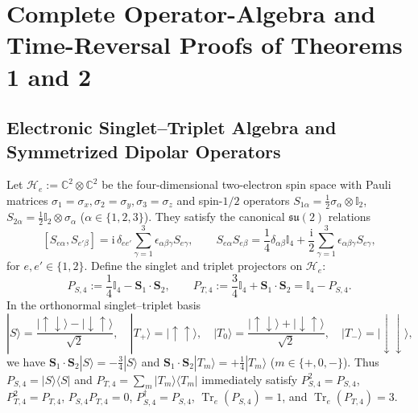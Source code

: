 \documentclass[onecolumn,10pt,notitlepage,amsmath,amssymb,floatfix]{revtex4-2}
\theoremstyle{plain}
\theoremstyle{definition}
\newcommand{\ii}{\mathrm{i}}
\newcommand{\Tr}{\operatorname{Tr}}
\begin{document}
\maketitle
\tableofcontents

\section{Complete Operator-Algebra and Time-Reversal Proofs of Theorems 1 and 2}
\label{sec:S1}

\subsection{Electronic Singlet--Triplet Algebra and Symmetrized Dipolar Operators}
\label{subsec:S1_elec}

Let $\mathcal{H}_e := \mathbb{C}^2 \otimes \mathbb{C}^2$ be the four-dimensional two-electron spin space with Pauli matrices $\sigma_1 = \sigma_x, \sigma_2 = \sigma_y, \sigma_3 = \sigma_z$ and spin-$1/2$ operators $S_{1\alpha} = \frac{1}{2}\sigma_\alpha \otimes \mathbb{I}_2$, $S_{2\alpha} = \frac{1}{2}\mathbb{I}_2 \otimes \sigma_\alpha$ ($\alpha \in \{1,2,3\}$). They satisfy the canonical $\mathfrak{su}(2)$ relations
\begin{equation}
\label{eq:S1_su2}
[S_{e\alpha}, S_{e'\beta}] = \ii\,\delta_{ee'}\sum_{\gamma=1}^3 \epsilon_{\alpha\beta\gamma} S_{e\gamma}, \qquad
S_{e\alpha} S_{e\beta} = \frac{1}{4}\delta_{\alpha\beta}\mathbb{I}_4 + \frac{\ii}{2}\sum_{\gamma=1}^3 \epsilon_{\alpha\beta\gamma} S_{e\gamma},
\end{equation}
for $e, e' \in \{1,2\}$. Define the singlet and triplet projectors on $\mathcal{H}_e$:
\begin{equation}
\label{eq:S1_proj}
P_{S,4} := \frac{1}{4}\mathbb{I}_4 - \mathbf{S}_1 \cdot \mathbf{S}_2, \qquad
P_{T,4} := \frac{3}{4}\mathbb{I}_4 + \mathbf{S}_1 \cdot \mathbf{S}_2 = \mathbb{I}_4 - P_{S,4}.
\end{equation}
In the orthonormal singlet--triplet basis
\begin{equation}
\label{eq:S1_st_basis}
|S\rangle = \frac{|\uparrow\downarrow\rangle - |\downarrow\uparrow\rangle}{\sqrt{2}}, \quad
|T_+\rangle = |\uparrow\uparrow\rangle, \quad
|T_0\rangle = \frac{|\uparrow\downarrow\rangle + |\downarrow\uparrow\rangle}{\sqrt{2}}, \quad
|T_-\rangle = |\downarrow\downarrow\rangle,
\end{equation}
we have $\mathbf{S}_1 \cdot \mathbf{S}_2 |S\rangle = -\frac{3}{4}|S\rangle$ and $\mathbf{S}_1 \cdot \mathbf{S}_2 |T_m\rangle = +\frac{1}{4}|T_m\rangle$ ($m \in \{+,0,-\}$). Thus $P_{S,4} = |S\rangle\langle S|$ and $P_{T,4} = \sum_m |T_m\rangle\langle T_m|$ immediately satisfy $P_{S,4}^2 = P_{S,4}$, $P_{T,4}^2 = P_{T,4}$, $P_{S,4}P_{T,4} = 0$, $P_{S,4}^\dagger = P_{S,4}$, $\Tr_e(P_{S,4}) = 1$, and $\Tr_e(P_{T,4}) = 3$.
\end{document}
